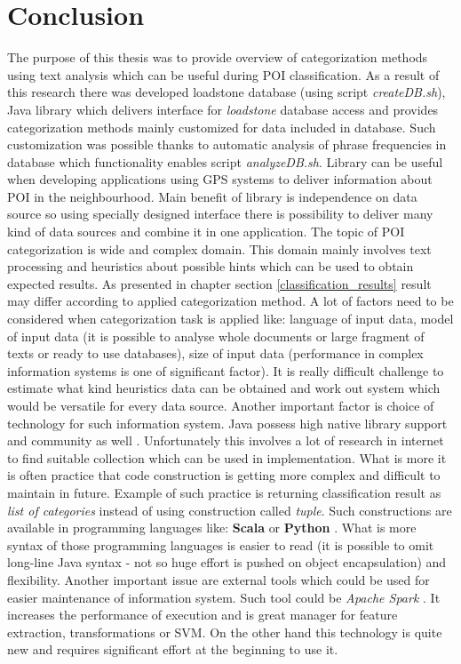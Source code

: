 \section{Conclusion}
The purpose of this thesis was to provide overview of categorization methods using text analysis which can be useful during POI classification. As a result of this research there was developed loadstone database (using script \textit{createDB.sh}), Java library which delivers interface for \textit{loadstone} database access and provides categorization methods mainly customized for data included in database. Such customization was possible thanks to automatic analysis of phrase frequencies in database which functionality enables script \textit{analyzeDB.sh}. Library can be useful when developing applications using GPS systems to deliver information about POI in the neighbourhood. Main benefit of library is independence on data source so using specially designed interface there is possibility to deliver many kind of data sources and combine it in one application. The topic of POI categorization is wide and complex domain. This domain mainly involves text processing and heuristics about possible hints which can be used to obtain expected results. As presented in chapter section \ref{classification_results} result may differ according to applied categorization method. A lot of factors need to be considered when categorization task is applied like: language of input data, model of input data (it is possible to analyse whole documents or large fragment of texts or ready to use databases), size of input data (performance in complex information systems is one of significant factor). It is really difficult challenge to estimate what kind heuristics data can be obtained and work out system which would be versatile for every data source. Another important factor is choice of technology for such information system. Java possess high native library support and community as well \cite{24} \cite{25}. Unfortunately this involves a lot of research in internet to find suitable collection which can be used in implementation. What is more it is often practice that code construction is getting more complex and difficult to maintain in future. Example of such practice is returning classification result as \textit{list of categories} instead of using construction called \textit{tuple}. Such constructions are available in programming languages like: \textbf{Scala} \cite{26} or \textbf{Python} \cite{27}. What is more syntax of those programming languages is easier to read (it is possible to omit long-line Java syntax - not so huge effort is pushed on object encapsulation) and flexibility. Another important issue are external tools which could be used for easier maintenance of information system. Such tool could be \textit{Apache Spark} \cite{28}. It increases the performance of execution and is great manager for feature extraction, transformations or SVM. On the other hand this technology is quite new and requires significant effort at the beginning to use it.     